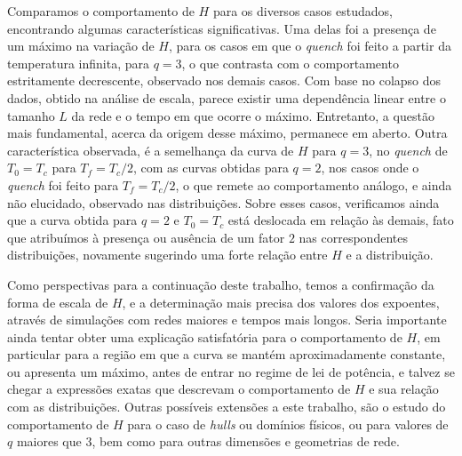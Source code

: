 Comparamos o comportamento de $H$ para os diversos casos estudados, encontrando algumas características significativas. Uma delas foi a presença de um máximo na variação de $H$, para os casos em que o \textit{quench} foi feito a partir da temperatura infinita, para $q=3$, o que contrasta com o comportamento estritamente decrescente, observado nos demais casos. Com base no colapso dos dados, obtido na análise de escala, parece existir uma dependência linear entre o tamanho $L$ da rede e o tempo em que ocorre o máximo. Entretanto, a questão mais fundamental, acerca da origem desse máximo, permanece em aberto. Outra característica observada, é a semelhança da curva de $H$ para $q=3$, no \textit{quench} de $T_0 = T_c$ para $T_f=T_c/2$, com as curvas obtidas para $q=2$, nos casos onde o \textit{quench} foi feito para $T_f=T_c/2$, o que remete ao comportamento análogo, e ainda não elucidado, observado nas distribuições. Sobre esses casos, verificamos ainda que a curva obtida para $q=2$ e $T_0=T_c$ está deslocada em relação às demais, fato que atribuímos à presença ou ausência de um fator $2$ nas correspondentes distribuições, novamente sugerindo uma forte relação entre $H$ e a distribuição.

Como perspectivas para a continuação deste trabalho, temos a confirmação da forma de escala de $H$, e a determinação mais precisa dos valores dos expoentes, através de simulações com redes maiores e tempos mais longos. Seria importante ainda tentar obter uma explicação satisfatória para o comportamento de $H$, em particular para a região em que a curva se mantém aproximadamente constante, ou apresenta um máximo, antes de entrar no regime de lei de potência, e talvez se chegar a expressões exatas que descrevam o comportamento de $H$ e sua relação com as distribuições. Outras possíveis extensões a este trabalho, são o estudo do comportamento de $H$ para o caso de \textit{hulls} ou domínios físicos, ou para valores de $q$ maiores que $3$, bem como para outras dimensões e geometrias de rede.

